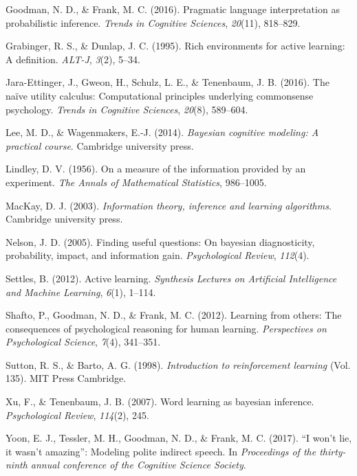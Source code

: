 \documentclass[10pt, letterpaper]{article}
\begin{document}
\hypertarget{ref-goodman2016}{}
Goodman, N. D., \& Frank, M. C. (2016). Pragmatic language
interpretation as probabilistic inference. \emph{Trends in Cognitive
Sciences}, \emph{20}(11), 818--829.

\hypertarget{ref-grabinger1995rich}{}
Grabinger, R. S., \& Dunlap, J. C. (1995). Rich environments for active
learning: A definition. \emph{ALT-J}, \emph{3}(2), 5--34.

\hypertarget{ref-jara2016}{}
Jara-Ettinger, J., Gweon, H., Schulz, L. E., \& Tenenbaum, J. B. (2016).
The naïve utility calculus: Computational principles underlying
commonsense psychology. \emph{Trends in Cognitive Sciences},
\emph{20}(8), 589--604.

\hypertarget{ref-lee2014bayesian}{}
Lee, M. D., \& Wagenmakers, E.-J. (2014). \emph{Bayesian cognitive
modeling: A practical course}. Cambridge university press.

\hypertarget{ref-lindley1956}{}
Lindley, D. V. (1956). On a measure of the information provided by an
experiment. \emph{The Annals of Mathematical Statistics}, 986--1005.

\hypertarget{ref-mackay2003}{}
MacKay, D. J. (2003). \emph{Information theory, inference and learning
algorithms}. Cambridge university press.

\hypertarget{ref-nelson2005}{}
Nelson, J. D. (2005). Finding useful questions: On bayesian
diagnosticity, probability, impact, and information gain.
\emph{Psychological Review}, \emph{112}(4).

\hypertarget{ref-settles2012active}{}
Settles, B. (2012). Active learning. \emph{Synthesis Lectures on
Artificial Intelligence and Machine Learning}, \emph{6}(1), 1--114.

\hypertarget{ref-shafto2012learning}{}
Shafto, P., Goodman, N. D., \& Frank, M. C. (2012). Learning from
others: The consequences of psychological reasoning for human learning.
\emph{Perspectives on Psychological Science}, \emph{7}(4), 341--351.

\hypertarget{ref-sutton1998}{}
Sutton, R. S., \& Barto, A. G. (1998). \emph{Introduction to
reinforcement learning} (Vol. 135). MIT Press Cambridge.

\hypertarget{ref-xu2007}{}
Xu, F., \& Tenenbaum, J. B. (2007). Word learning as bayesian inference.
\emph{Psychological Review}, \emph{114}(2), 245.

\hypertarget{ref-yoon2017}{}
Yoon, E. J., Tessler, M. H., Goodman, N. D., \& Frank, M. C. (2017). ``I
won't lie, it wasn't amazing'': Modeling polite indirect speech. In
\emph{Proceedings of the thirty-ninth annual conference of the Cognitive
Science Society}.
\end{document}
